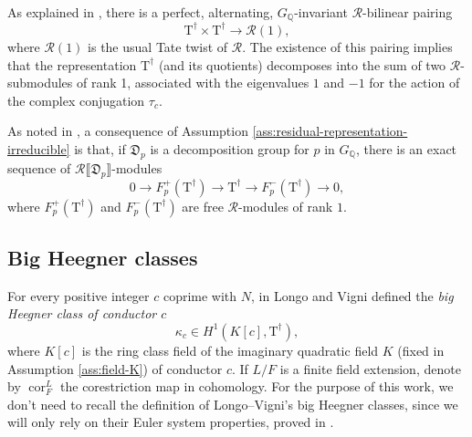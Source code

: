 \documentclass[12pt,reqno]{amsart}
\theoremstyle{definition}
\theoremstyle{remark}
\newcommand{\numberset}{\mathbb}
\newcommand{\Q}{\numberset{Q}}
\newcommand{\T}{\boldsymbol{\mathrm{T}}}
\newcommand{\calR}{\mathcal{R}}
\DeclareMathOperator{\Cor}{cor}
\begin{document}
        As explained in \cite[(3)]{Howard07:variation-of-Heegner-points-in-Hida-families}, there is a perfect, alternating, $G_\Q$-invariant $\calR$-bilinear pairing
        \begin{equation}\label{eq:pairing}
            \T^\dag\times\T^\dag\longrightarrow\calR(1),
        \end{equation}
        where $\calR(1)$ is the usual Tate twist of $\calR$. The existence of this pairing implies that the representation $\T^\dag$ (and its quotients) decomposes into the sum of two $\calR$-submodules of rank 1, associated with the eigenvalues $1$ and $-1$ for the action of the complex conjugation $\tau_c$.

        As noted in \cite[p.~300]{Longo-Vigni11:quaternion-algebras-Hida-families}, a consequence of Assumption \ref{ass:residual-representation-irreducible} is that, if $\mathfrak{D}_p$ is a decomposition group for $p$ in $G_{\Q}$, there is an exact sequence of $\mathcal{R}\llbracket \mathfrak{D}_p\rrbracket$-modules
        \begin{equation}\label{eq:exact-sequence-at-p}
            0\longrightarrow F_p^+(\T^\dag)\longrightarrow \T^\dag\longrightarrow F_p^-(\T^\dag)\longrightarrow 0,
        \end{equation}
        where $F_p^+(\T^\dag)$ and $F_p^-(\T^\dag)$ are free $\mathcal{R}$-modules of rank $1$.





\subsection{Big Heegner classes} \label{sec:big-heegner-classes}

For every positive integer $c$ coprime with $N$, in \cite[Definition 7.4]{Longo-Vigni11:quaternion-algebras-Hida-families} Longo and Vigni defined the \emph{big Heegner class of conductor $c$}
\begin{equation*}
    \kappa_c\in H^1(K[c],\T^{\dag}),
\end{equation*}
where $K[c]$ is the ring class field of the imaginary quadratic field $K$ (fixed in Assumption \ref{ass:field-K}) of conductor $c$. If $L/F$ is a finite field extension, denote by $\Cor^L_F$ the corestriction map in cohomology. For the purpose of this work, we don't need to recall the definition of Longo--Vigni's big Heegner classes, since we will only rely on their Euler system properties, proved in \cite[§8]{Longo-Vigni11:quaternion-algebras-Hida-families}. 
\end{document}
